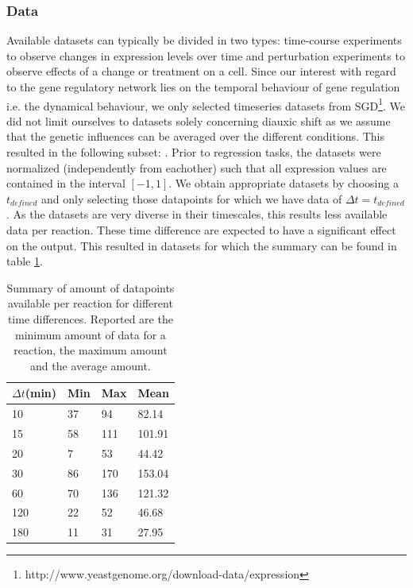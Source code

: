 \subsubsection{Data}
Available datasets can typically be divided in two types: time-course experiments to observe changes in expression levels over time and perturbation experiments to observe effects of a change or treatment on a cell. Since our interest with 
regard to the gene regulatory network lies on the temporal behaviour of gene regulation i.e. the dynamical behaviour, we only selected timeseries datasets from SGD\footnote{http://www.yeastgenome.org/download-data/expression}. We did not 
limit ourselves to datasets solely concerning diauxic shift as we assume that the genetic influences can be averaged over the different conditions. 
This resulted in the following subset: \cite{brauer2005homeostatic,spellman1998comprehensive,cho1998genome,derisi1997exploring,lee2000arrest,carmel2001role}.
Prior to regression tasks, the datasets were normalized (independently from eachother) such that all expression values are contained in the interval $[-1,1]$.%
We obtain appropriate datasets by choosing a $t_{defined}$ and only selecting those datapoints for which we have data of $\Delta t = t_{defined}$. As the datasets are very diverse in their timescales, this results less available data per reaction. These time 
difference are expected to have a significant effect on the output. This resulted in datasets for which the summary can be found in table \ref{tab:summary_time_datasets}.
\begin{table}[htb]
	\centering
    \begin{tabular}{llll}
    \hline
$\Delta t$(min)&Min&Max&Mean\\
\hline
10&37&94&82.14\\
15&58&111&101.91\\
20&7&53&44.42\\
30&86&170&153.04\\
60&70&136&121.32\\
120&22&52&46.68\\
180&11&31&27.95\\
    \hline
    \end{tabular}
    \caption{ Summary of amount of datapoints available per reaction for different time differences. Reported are the minimum amount of data for a reaction, the maximum amount and the average amount. }
	\label{tab:summary_time_datasets}

\end{table}
